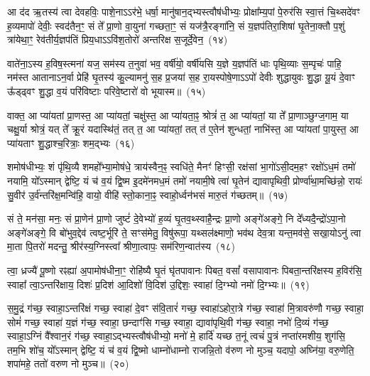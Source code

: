 {\anuvakamend[{भव॑त॒मेक॑त्रिꣳशच्च}]}

आ द॑द ऋ॒तस्य॑ त्वा देवहविः॒ पाशे॒ना\-ऽऽ\-र॑भे॒ धर्\mbox{}षा॒ मानु॑षान॒द्भ्यस्त्वौष॑धीभ्यः॒ प्रोक्षा᳚म्य॒पां पे॒रुर॑सि स्वा॒त्तं चि॒थ्सदे॑वꣳ ह॒व्यमापो॑ देवीः॒ स्वद॑तैन॒ꣳ॒ सं ते᳚ प्रा॒णो वा॒युना॑ गच्छता॒ꣳ॒ सं यज॑त्रै॒रङ्गा॑नि॒ सं य॒ज्ञप॑तिरा॒शिषा॑ घृ॒तेना॒क्तौ प॒शुं त्रा॑येथा॒ꣳ॒ रेव॑तीर्य॒ज्ञप॑तिं प्रिय॒धा\-ऽऽ\-वि॑श॒तोरो॑ अन्तरिक्ष स॒जूर्दे॒वेन॒~(१४)\ip

वाते॑ना॒\-ऽस्य ह॒विष॒स्त्मना॑ यज॒ सम॑स्य त॒नुवा॑ भव॒ वर्\mbox{}षी॑यो॒ वर्\mbox{}षी॑यसि य॒ज्ञे य॒ज्ञप॑तिं धाः पृथि॒व्याः स॒म्पृचः॑ पाहि॒ नम॑स्त आताना\-ऽन॒र्वा प्रेहि॑ घृ॒तस्य॑ कु॒ल्यामनु॑ स॒ह प्र॒जया॑ स॒ह रा॒यस्पोषे॒णा\-ऽऽ\-पो॑ देवीः शुद्धायुवः शु॒द्धा यू॒यं दे॒वाꣳ ऊ᳚ड्ढ्वꣳ शु॒द्धा व॒यं परि॑विष्टाः परिवे॒ष्टारो॑ वो भूयास्म॥~(१५)\ip

{\anuvakamend[{दे॒वेन॒ चतु॑श्चत्वारिꣳशच्च}]}

वाक्त॒ आ प्या॑यतां प्रा॒णस्त॒ आ प्या॑यतां॒ चक्षु॑स्त॒ आ प्या॑यता॒ꣴ॒ श्रोत्रं॑ त॒ आ प्या॑यतां॒ या ते᳚ प्रा॒णाञ्छुग्ज॒गाम॒ या चक्षु॒र्या श्रोत्रं॒ यत् ते᳚ क्रू॒रं यदास्थि॑तं॒ तत् त॒ आ प्या॑यतां॒ तत् त॑ ए॒तेन॑ शुन्धतां॒ नाभि॑स्त॒ आ प्या॑यतां पा॒युस्त॒ आ प्या॑यताꣳ शु॒द्धाश्च॒रित्राः॒ शम॒द्भ्यः~(१६)\ip

शमोष॑धीभ्यः॒ शं पृ॑थि॒व्यै शमहो᳚भ्या॒मोष॑धे॒ त्राय॑स्वैन॒ꣴ॒ स्वधि॑ते॒ मैनꣳ॑ हिꣳसी॒ रक्ष॑सां भा॒गो॑\-ऽसी॒दम॒हꣳ रक्षो॑\-ऽध॒मं तमो॑ नयामि॒ यो᳚\-ऽस्मान् द्वेष्टि॒ यं च॑ व॒यं द्वि॒ष्म इ॒दमे॑नमध॒मं तमो॑ नयामी॒षे त्वा॑ घृ॒तेन॑ द्यावा\-पृथिवी॒ प्रोर्ण्वा॑था॒मच्छि॑न्नो॒ रायः॑ सु॒वीर॑ उ॒र्व॑न्तरि॑क्ष॒मन्वि॑हि॒ वायो॒ वीहि॑ स्तो॒काना॒ꣴ॒ स्वाहो॒र्ध्वन॑भसं मारु॒तं ग॑च्छतम्॥~(१७)\ip

{\anuvakamend[{अ॒द्भ्यो वीहि॒ पञ्च॑ च}]}

सं ते॒ मन॑सा॒ मनः॒ सं प्रा॒णेन॑ प्रा॒णो जुष्टं॑ दे॒वेभ्यो॑ ह॒व्यं घृ॒तव॒थ्\-स्वाहै॒न्द्रः प्रा॒णो अङ्गे॑अङ्गे॒ नि दे᳚ध्यदै॒न्द्रो॑\-ऽपा॒नो अङ्गे॑अङ्गे॒ वि बो॑भुव॒द्देव॑ त्वष्ट॒र्भूरि॑ ते॒ सꣳस॑मेतु॒ विषु॑रूपा॒ यथ्सल॑क्ष्माणो॒ भव॑थ देव॒त्रा यन्त॒मव॑से॒ सखा॒यो\-ऽनु॑ त्वा मा॒ता पि॒तरो॑ मदन्तु॒ श्रीर॑स्य॒ग्निस्त्वा᳚ श्रीणा॒त्वापः॒ सम॑रिण॒न्वात॑स्य~(१८)\ip

त्वा॒ ध्रज्यै॑ पू॒ष्णो रꣴह्या॑ अ॒पामोष॑धीना॒ꣳ॒ रोहि॑ष्यै घृ॒तं घृ॑तपावानः पिबत॒ वसां᳚ वसापावानः पिबता॒न्त\-रि॑क्षस्य ह॒विर॑सि॒ स्वाहा᳚ त्वा॒\-ऽन्तरि॑क्षाय॒ दिशः॑ प्र॒दिश॑ आ॒दिशो॑ वि॒दिश॑ उ॒द्दिशः॒ स्वाहा॑ दि॒ग्भ्यो नमो॑ दि॒ग्भ्यः॥~(१९)\ip

{\anuvakamend[{वात॑स्या॒ष्टाविꣳ॑शतिश्च}]}%

स॒मु॒द्रं ग॑च्छ॒ स्वाहा॒\-ऽन्तरि॑क्षं गच्छ॒ स्वाहा॑ दे॒वꣳ स॑वि॒तारं॑ गच्छ॒ स्वाहा॑\-ऽहोरा॒त्रे ग॑च्छ॒ स्वाहा॑ मि॒त्रावरु॑णौ गच्छ॒ स्वाहा॒ सोमं॑ गच्छ॒ स्वाहा॑ य॒ज्ञं ग॑च्छ॒ स्वाहा॒ छन्दाꣳ॑सि गच्छ॒ स्वाहा॒ द्यावा॑\-पृथि॒वी ग॑च्छ॒ स्वाहा॒ नभो॑ दि॒व्यं ग॑च्छ॒ स्वाहा॒\-ऽग्निं वै᳚श्वान॒रं ग॑च्छ॒ स्वाहा॒\-ऽद्भ्यस्त्वौष॑धीभ्यो॒ मनो॑ मे॒ हार्दि॑ यच्छ त॒नूं त्वचं॑ पु॒त्रं नप्ता॑रमशीय॒ शुग॑सि॒ तम॒भि शो॑च॒ यो᳚\-ऽस्मान् द्वेष्टि॒ यं च॑ व॒यं द्वि॒ष्मो धाम्नो॑धाम्नो राजन्नि॒तो व॑रुण नो मुञ्च॒ यदापो॒ अघ्नि॑या॒ वरु॒णेति॒ शपा॑महे॒ ततो॑ वरुण नो मुञ्च॥~(२०)\ip

